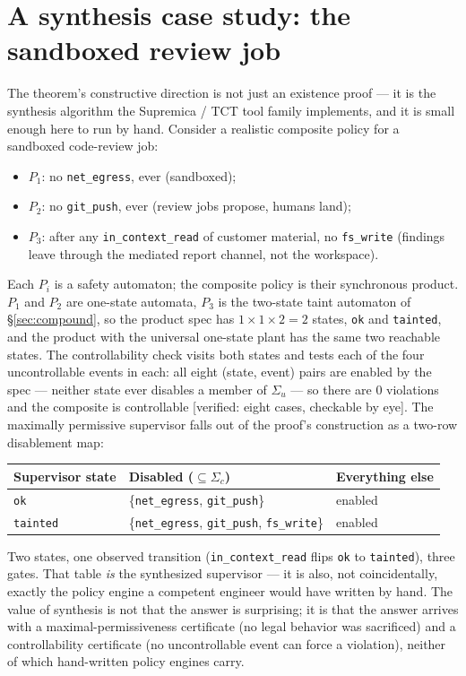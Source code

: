 \documentclass[11pt,a4paper]{article}  \usepackage{mdframed} \usepackage{graphicx}
\begin{document}
\section{A synthesis case study: the sandboxed review job}\label{sec:synthesis} The theorem's constructive direction is not
just an existence proof --- it is the synthesis algorithm the Supremica / TCT tool family implements, and it is small enough
here to run by hand. Consider a realistic composite policy for a sandboxed code-review job: \begin{itemize} \item $P_1$: no
\texttt{net\_egress}, ever (sandboxed); \item $P_2$: no \texttt{git\_push}, ever (review jobs propose, humans land); \item
$P_3$: after any \texttt{in\_context\_read} of customer material, no \texttt{fs\_write} (findings leave through the mediated
report channel, not the workspace). \end{itemize} Each $P_i$ is a safety automaton; the composite policy is their synchronous
product. $P_1$ and $P_2$ are one-state automata, $P_3$ is the two-state taint automaton of \S\ref{sec:compound}, so the
product spec has $1\times1\times2=2$ states, \texttt{ok} and \texttt{tainted}, and the product with the universal one-state
plant has the same two reachable states. The controllability check visits both states and tests each of the four
uncontrollable events in each: all eight (state, event) pairs are enabled by the spec --- neither state ever disables a
member of $\Sigma_u$ --- so there are $0$ violations and the composite is controllable [verified: eight cases, checkable by
eye]. The maximally permissive supervisor falls out of the proof's construction as a two-row disablement map: \begin{center}
\begin{tabular}{@{}lll@{}} \toprule Supervisor state & Disabled ($\subseteq\Sigma_c$) & Everything else \\ \midrule
\texttt{ok} & \{\texttt{net\_egress}, \texttt{git\_push}\} & enabled \\ \texttt{tainted} & \{\texttt{net\_egress},
\texttt{git\_push}, \texttt{fs\_write}\} & enabled \\ \bottomrule \end{tabular} \end{center} Two states, one observed
transition (\texttt{in\_context\_read} flips \texttt{ok} to \texttt{tainted}), three gates. That table \emph{is} the
synthesized supervisor --- it is also, not coincidentally, exactly the policy engine a competent engineer would have written
by hand. The value of synthesis is not that the answer is surprising; it is that the answer arrives with a
maximal-permissiveness certificate (no legal behavior was sacrificed) and a controllability certificate (no uncontrollable
event can force a violation), neither of which hand-written policy engines carry.
\end{document}
